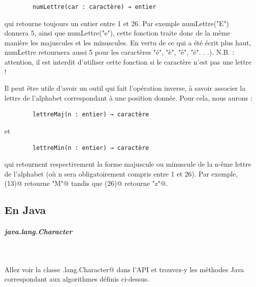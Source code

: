 \documentclass[11pt,a4paper]{article}
\begin{document}
            \par
        \begin{verbatim}
        numLettre(car : caractère) → entier
      \end{verbatim}
        qui retourne toujours un entier entre 1 et 26. Par exemple numLettre("E") donnera 5, ainsi
        que numLettre("e"), cette fonction traite donc de la m\^eme mani\`ere les majuscules et les
        minuscules. En vertu de ce qui a \'et\'e \'ecrit plus haut, numLettre retournera aussi 5 pour les
        caract\`eres "\'e", "\`e", "\^e", "\"e". . .). N.B. : attention, il est interdit d'utiliser cette fonction si le
        caract\`ere n'est pas une lettre !
      
            \par
        
        Il peut \^etre utile d'avoir un outil qui fait l'op\'eration inverse, \`a savoir associer la lettre de
        l'alphabet correspondant \`a une position donn\'ee. Pour cela, nous aurons :
      
            \par
        \begin{verbatim}
        lettreMaj(n : entier) → caractère
      \end{verbatim}
        et
      
            \par
        \begin{verbatim}
        lettreMin(n : entier) → caractère
      \end{verbatim}
        qui retournent respectivement la forme majuscule ou minuscule de la n-\`eme lettre de l'alphabet 
        (o\`u n sera obligatoirement compris entre 1 et 26). Par exemple, 
        \verb@lettreMaj(13)@ retourne
        \verb@"M"@ tandis que 
        \verb@lettreMin(26)@ 
        retourne \verb@"z"@.
      
            \par
        \subsection{En Java}
			
		\subparagraph{java.lang.Character} 
		
					\textcolor{white}{.} \par
				
		    Allez voir la classe \verb@java.lang.Character@ dans l'API
		    et trouvez-y les m\'ethodes Java correspondant aux algorithmes d\'efinis ci-dessus.
		  
\end{document}
